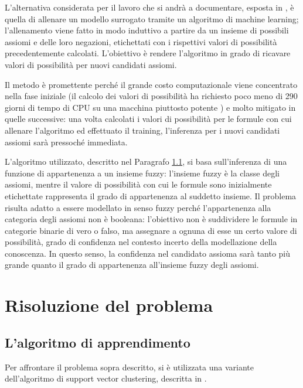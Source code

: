 \documentclass[12pt,a4paper]{report}
\begin{document}
L'alternativa considerata per il lavoro che si andrà a documentare, esposta in \cite{sacpaper}, è quella di allenare un modello surrogato tramite un algoritmo di machine learning; l'allenamento viene fatto in modo induttivo a partire da un insieme di possibili assiomi e delle loro negazioni, etichettati con i rispettivi valori di possibilità precedentemente calcolati. L'obiettivo è rendere l'algoritmo in grado di ricavare valori di possibilità per nuovi candidati assiomi.


Il metodo è promettente perché il grande costo computazionale viene concentrato nella fase iniziale (il calcolo dei valori di possibilità ha richiesto poco meno di 290 giorni di tempo di CPU su una macchina piuttosto potente \cite{sacpaper}) e molto mitigato in quelle successive: una volta calcolati i valori di possibilità per le formule con cui allenare l'algoritmo ed effettuato il training, l'inferenza per i nuovi candidati assiomi sarà pressoché immediata.

L'algoritmo utilizzato, descritto nel Paragrafo \ref{algorithmParagraph}, si basa sull'inferenza di una funzione di appartenenza a un insieme fuzzy: l'insieme fuzzy è la classe degli assiomi, mentre il valore di possibilità con cui le formule sono inizialmente etichettate rappresenta il grado di appartenenza al suddetto insieme.
Il problema risulta adatto a essere modellato in senso fuzzy perché l'appartenenza alla categoria degli assiomi non è booleana: l'obiettivo non è suddividere le formule in categorie binarie di vero o falso, ma assegnare a ognuna di esse un certo valore di possibilità, grado di confidenza nel contesto incerto della modellazione della conoscenza. In questo senso, la confidenza nel candidato assioma sarà tanto più grande quanto il grado di appartenenza all'insieme fuzzy degli assiomi.

\chapter{Risoluzione del problema}
\section{L'algoritmo di apprendimento}\label{algorithmParagraph}
Per affrontare il problema sopra descritto, si è utilizzata una variante dell'algoritmo di support vector clustering, descritta in \cite{svpaper}.
\end{document}
